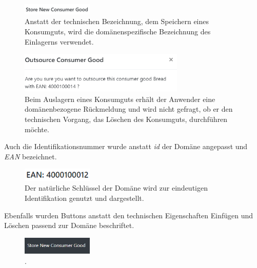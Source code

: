 \begin{figure}[H]
	\centering
	\includegraphics[width=0.3\textwidth]{Bilder/gui/Ubiquitous Language/store-text.PNG}
	\caption[Überschrift Eingabemaske zum Einlagern eines Konsumguts.]{Anstatt der technischen Bezeichnung, dem Speichern eines Konsumguts, wird die domänenspezifische Bezeichnung des Einlagerns verwendet.}
	\label{fig:gui-titel-einlagern}
\end{figure}

\begin{figure}[H]
	\centering
	\includegraphics[width=0.7\textwidth]{Bilder/gui/Ubiquitous Language/outsource-text.PNG}
	\caption[Bezeichnung eines Auslagerungsvorgangs.]{Beim Auslagern eines Konsumguts erhält der Anwender eine domänenbezogene Rückmeldung und wird nicht gefragt, ob er den technischen Vorgang, das Löschen des Konsumguts, durchführen möchte.}
	\label{fig:gui-titel-auslagern}
\end{figure}

Auch die Identifikationsnummer wurde anstatt \textit{id} der Domäne angepasst und \textit{EAN} bezeichnet. 

\begin{figure}[H]
	\centering
	\includegraphics[width=0.3\textwidth]{Bilder/gui/Ubiquitous Language/ean.PNG}
	\caption[Darstellung EAN-Code.]{Der natürliche Schlüssel der Domäne wird zur eindeutigen Identifikation genutzt und dargestellt.}
	\label{fig:gui-darstellung-ean}
\end{figure}

Ebenfalls wurden Buttons anstatt den technischen Eigenschaften Einfügen und Löschen passend zur Domäne beschriftet.

\begin{figure}[H]
	\centering
	\includegraphics[width=0.3\textwidth]{Bilder/gui/Ubiquitous Language/Store new consumer good.PNG}
	\caption[Button zum Öffnen der Eingabemaske zum Einlagern eines Konsumguts.]{.}
	\label{fig:gui-button-eingabemaske-einlagern}
\end{figure}

